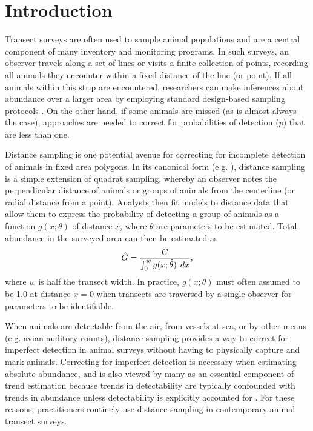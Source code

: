 \documentclass[10pt]{article}
\begin{document}

\section*{Introduction}

Transect surveys are often used to sample animal populations and are a central component of many inventory and monitoring programs.  In such surveys, an observer travels along a set of lines or visits a finite collection of points, recording all animals they encounter within a fixed distance of the line (or point).  If all animals within this strip are encountered, researchers can make inferences about abundance over a larger area by employing standard design-based sampling protocols \cite{Cochran1977}.  On the other hand, if some animals are missed (as is almost always the case), approaches are needed to correct for probabilities of detection ($p$) that are less than one.

Distance sampling is one potential avenue for correcting for incomplete detection of animals in fixed area polygons.  In its canonical form (e.g. \cite{BurnhamEtAl1980,BucklandEtAl2001}), distance sampling is a simple extension of quadrat sampling, whereby an observer notes the perpendicular distance of animals or groups of animals from the centerline (or radial distance from a point).  Analysts then fit models to distance data that allow them to express the probability of detecting a group of animals as a function $g(x;\theta)$ of distance $x$, where $\theta$ are parameters to be estimated. Total abundance in the surveyed area can then be estimated as
$$
\hat{G} = \frac{C}{\int_0^w g(x;\hat{\theta}) \hspace{1.5mm}dx},
$$
where $w$ is half the transect width.  In practice, $g(x;\theta)$ must often assumed to be 1.0 at distance $x=0$ when transects are traversed by a single observer for parameters to be identifiable.

When animals are detectable from the air, from vessels at sea, or by other means (e.g. avian auditory counts), distance sampling provides a way to correct for imperfect detection in animal surveys without having to physically capture and mark animals.  Correcting for imperfect detection is necessary when estimating absolute abundance, and is also viewed by many as an essential component of trend estimation because trends in detectability are typically confounded with trends in abundance unless detectability is explicitly accounted for \cite{Buckland2006,NicholsEtAl2009}.  For these reasons, practitioners routinely use distance sampling in contemporary animal transect surveys.
\end{document}
